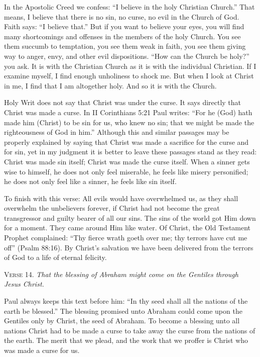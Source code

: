 In the Apostolic Creed we confess: “I believe in the holy Christian Church.” That means, I believe that there is no sin, no curse, no evil in the Church of God. Faith says: “I believe that.” But if you want to believe your eyes, you will find many shortcomings and offenses in the members of the holy Church. You see them succumb to temptation, you see them weak in faith, you see them giving way to anger, envy, and other evil dispositions. “How can the Church be holy?” you ask. It is with the Christian Church as it is with the individual Christian. If I examine myself, I find enough unholiness to shock me. But when I look at Christ in me, I find that I am altogether holy. And so it is with the Church.

Holy Writ does not say that Christ was under the curse. It says directly that Christ was made a curse. In II Corinthians 5:21 Paul writes: “For he (God) hath made him (Christ) to be sin for us, who knew no sin; that we might be made the righteousness of God in him.” Although this and similar passages may be properly explained by saying that Christ was made a sacrifice for the curse and for sin, yet in my judgment it is better to leave these passages stand as they read: Christ was made sin itself; Christ was made the curse itself. When a sinner gets wise to himself, he does not only feel miserable, he feels like misery personified; he does not only feel like a sinner, he feels like sin itself.

To finish with this verse: All evils would have overwhelmed us, as they shall overwhelm the unbelievers forever, if Christ had not become the great transgressor and guilty bearer of all our sins. The sins of the world got Him down for a moment. They came around Him like water. Of Christ, the Old Testament Prophet complained: “Thy fierce wrath goeth over me; thy terrors have cut me off” (Psalm 88:16). By Christ’s salvation we have been delivered from the terrors of God to a life of eternal felicity.

\textsc{Verse} 14. \emph{That the blessing of Abraham might come on the Gentiles through Jesus Christ.}

Paul always keeps this text before him: “In thy seed shall all the nations of the earth be blessed.” The blessing promised unto Abraham could come upon the Gentiles only by Christ, the seed of Abraham. To become a blessing unto all nations Christ had to be made a curse to take away the curse from the nations of the earth. The merit that we plead, and the work that we proffer is Christ who was made a curse for us.

